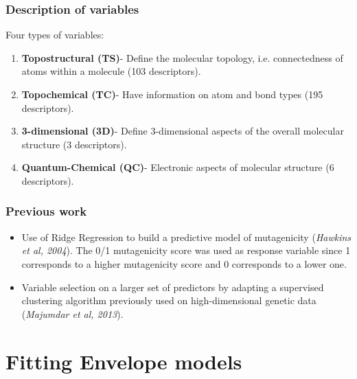 \documentclass[handout,10pt]{beamer}
\begin{document}
\begin{frame}
\frametitle{Description of variables}
Four types of variables:\vspace{.5cm}
\begin{enumerate}
\item \textbf{Topostructural (TS)}- Define the molecular topology, i.e. connectedness of atoms within a molecule (103 descriptors).
\vspace{.2cm}
\item \textbf{Topochemical (TC)}- Have information on atom and bond types (195 descriptors).
\vspace{.2cm}
\item \textbf{3-dimensional (3D)}- Define 3-dimensional aspects of the overall molecular structure (3 descriptors).
\vspace{.2cm}
\item \textbf{Quantum-Chemical (QC)}- Electronic aspects of molecular structure (6 descriptors).
\end{enumerate}
\end{frame}

\begin{frame}
\frametitle{Previous work}
\begin{itemize}
\item Use of {\colbbf Ridge Regression} to build a predictive model of mutagenicity (\textit{Hawkins et al, 2004}). The 0/1 mutagenicity score was used as response variable since 1 corresponds to a higher mutagenicity score and 0 corresponds to a lower one.
\vspace{0.5cm}
\item {\colbbf Variable selection} on a larger set of predictors by adapting a supervised clustering algorithm previously used on high-dimensional genetic data (\textit{Majumdar et al, 2013}).
\end{itemize}
\end{frame}

\section{Fitting Envelope models}
\end{document}
